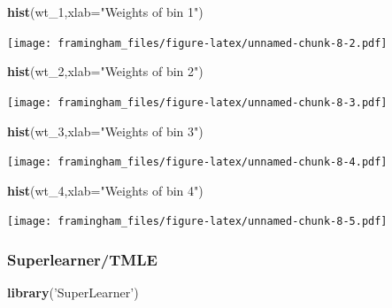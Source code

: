 \documentclass[]{article}
\newenvironment{Shaded}{\begin{snugshade}}{\end{snugshade}}
\newcommand{\KeywordTok}[1]{\textcolor[rgb]{0.13,0.29,0.53}{\textbf{#1}}}
\newcommand{\DataTypeTok}[1]{\textcolor[rgb]{0.13,0.29,0.53}{#1}}
\newcommand{\DecValTok}[1]{\textcolor[rgb]{0.00,0.00,0.81}{#1}}
\newcommand{\StringTok}[1]{\textcolor[rgb]{0.31,0.60,0.02}{#1}}
\newcommand{\NormalTok}[1]{#1}
\begin{document}
\begin{Shaded}
\begin{Highlighting}[]
\KeywordTok{hist}\NormalTok{(wt_}\DecValTok{1}\NormalTok{,}\DataTypeTok{xlab=}\StringTok{"Weights of bin 1"}\NormalTok{)}
\end{Highlighting}
\end{Shaded}

\texttt{[image: framingham\_files/figure-latex/unnamed-chunk-8-2.pdf]}

\begin{Shaded}
\begin{Highlighting}[]
\KeywordTok{hist}\NormalTok{(wt_}\DecValTok{2}\NormalTok{,}\DataTypeTok{xlab=}\StringTok{"Weights of bin 2"}\NormalTok{)}
\end{Highlighting}
\end{Shaded}

\texttt{[image: framingham\_files/figure-latex/unnamed-chunk-8-3.pdf]}

\begin{Shaded}
\begin{Highlighting}[]
\KeywordTok{hist}\NormalTok{(wt_}\DecValTok{3}\NormalTok{,}\DataTypeTok{xlab=}\StringTok{"Weights of bin 3"}\NormalTok{)}
\end{Highlighting}
\end{Shaded}

\texttt{[image: framingham\_files/figure-latex/unnamed-chunk-8-4.pdf]}

\begin{Shaded}
\begin{Highlighting}[]
\KeywordTok{hist}\NormalTok{(wt_}\DecValTok{4}\NormalTok{,}\DataTypeTok{xlab=}\StringTok{"Weights of bin 4"}\NormalTok{)}
\end{Highlighting}
\end{Shaded}

\texttt{[image: framingham\_files/figure-latex/unnamed-chunk-8-5.pdf]}

\subsubsection{Superlearner/TMLE}\label{superlearnertmle}

\begin{Shaded}
\begin{Highlighting}[]
\KeywordTok{library}\NormalTok{(}\StringTok{'SuperLearner'}\NormalTok{)}
\end{Highlighting}
\end{Shaded}
\end{document}
